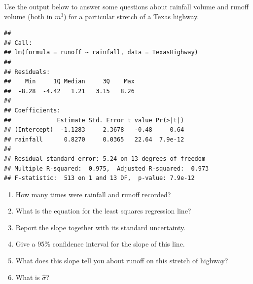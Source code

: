\documentclass[twoside]{book}\usepackage[]{graphicx}\usepackage[]{xcolor}
\makeatletter
\newenvironment{kframe}{%
 \def\at@end@of@kframe{}%
 \ifinner\ifhmode%
  \def\at@end@of@kframe{\end{minipage}}%
  \begin{minipage}{\columnwidth}%
 \fi\fi%
 \def\FrameCommand##1{\hskip\@totalleftmargin \hskip-\fboxsep
 \colorbox{shadecolor}{##1}\hskip-\fboxsep
     \hskip-\linewidth \hskip-\@totalleftmargin \hskip\columnwidth}%
 \MakeFramed {\advance\hsize-\width
   \@totalleftmargin\z@ \linewidth\hsize
   \@setminipage}}%
 {\par\unskip\endMakeFramed%
 \at@end@of@kframe}
\newenvironment{knitrout}{}{} %
\makeatother
\begin{document}
\begin{problem}
	Use the output below to answer some questions about rainfall volume  and 
	runoff volume (both in $m^3$) for a particular stretch of a Texas highway.
\begin{knitrout}
\color{fgcolor}\begin{kframe}
\begin{verbatim}
## 
## Call:
## lm(formula = runoff ~ rainfall, data = TexasHighway)
## 
## Residuals:
##    Min     1Q Median     3Q    Max 
##  -8.28  -4.42   1.21   3.15   8.26 
## 
## Coefficients:
##             Estimate Std. Error t value Pr(>|t|)
## (Intercept)  -1.1283     2.3678   -0.48     0.64
## rainfall      0.8270     0.0365   22.64  7.9e-12
## 
## Residual standard error: 5.24 on 13 degrees of freedom
## Multiple R-squared:  0.975,	Adjusted R-squared:  0.973 
## F-statistic:  513 on 1 and 13 DF,  p-value: 7.9e-12
\end{verbatim}
\end{kframe}
\end{knitrout}
	\begin{enumerate}
		\item
			How many times were rainfall and runoff recorded?
		\item
			What is the equation for the least squares regression line?
		\item
			Report the slope together with its standard uncertainty.
		\item
			Give a 95\% confidence interval for the slope of this line.
		\item
			What does this slope tell you about runoff on this
			stretch of highway?
		\item
			What is $\hat\sigma$?
	\end{enumerate}
\end{problem}
\end{document}
